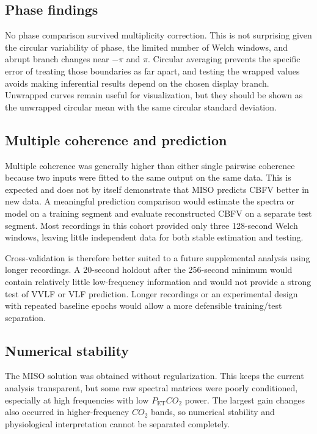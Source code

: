 \documentclass[12pt]{article}
\newcommand{\PETCOtwo}{P_{\mathrm{ET}}CO_2}
\newcommand{\COtwo}{CO_2}
\begin{document}
\subsection{Phase findings}

No phase comparison survived multiplicity correction. This is not surprising
given the circular variability of phase, the limited number of Welch windows,
and abrupt branch changes near $-\pi$ and $\pi$. Circular averaging prevents
the specific error of treating those boundaries as far apart, and testing the
wrapped values avoids making inferential results depend on the chosen display
branch. Unwrapped curves remain useful for visualization, but they should be
shown as the unwrapped circular mean with the same circular standard deviation.

\subsection{Multiple coherence and prediction}

Multiple coherence was generally higher than either single pairwise coherence
because two inputs were fitted to the same output on the same data. This is
expected and does not by itself demonstrate that MISO predicts CBFV better in
new data. A meaningful prediction comparison would estimate the spectra or
model on a training segment and evaluate reconstructed CBFV on a separate
test segment. Most recordings in this cohort provided only three 128-second
Welch windows, leaving little independent data for both stable estimation and
testing.

Cross-validation is therefore better suited to a future supplemental analysis
using longer recordings. A 20-second holdout after the 256-second minimum
would contain relatively little low-frequency information and would not
provide a strong test of VVLF or VLF prediction. Longer recordings or an
experimental design with repeated baseline epochs would allow a more
defensible training/test separation.

\subsection{Numerical stability}

The MISO solution was obtained without regularization. This keeps the current
analysis transparent, but some raw spectral matrices were poorly conditioned,
especially at high frequencies with low $\PETCOtwo$ power. The largest gain
changes also occurred in higher-frequency $\COtwo$ bands, so numerical
stability and physiological interpretation cannot be separated completely.
\end{document}
